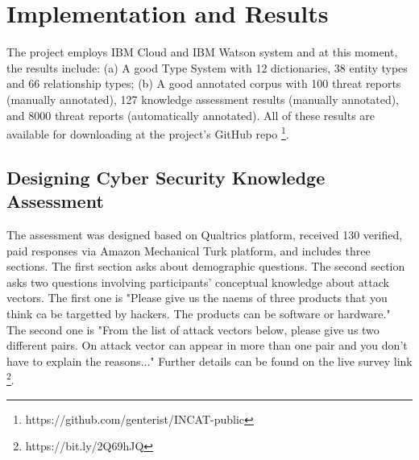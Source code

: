 \documentclass[conference]{IEEEtran}
\begin{document}
\section{Implementation and Results}
The project employs IBM Cloud and IBM Watson system and at this moment, the results include: (a) A good Type System with 12 dictionaries, 38 entity types and 66 relationship types; (b) A good annotated corpus with 100 threat reports (manually annotated), 127 knowledge assessment results (manually annotated), and 8000 threat reports (automatically annotated). All of these results are available for downloading at the project's GitHub repo \footnote{https://github.com/genterist/INCAT-public}.

\subsection{Designing Cyber Security Knowledge Assessment}
The assessment was designed based on Qualtrics platform, received 130 verified, paid responses via Amazon Mechanical Turk platform, and includes three sections. The first section asks about demographic questions. The second section asks two questions involving participants' conceptual knowledge about attack vectors. The first one is "Please give us the naems of three products that you think ca be targetted by hackers. The products can be software or hardware." The second one is "From the list of attack vectors below, please give us two different pairs. On attack vector can appear in more than one pair and you don't have to explain the reasons..." Further details can be found on the live survey link \footnote{https://bit.ly/2Q69hJQ}.
\end{document}
